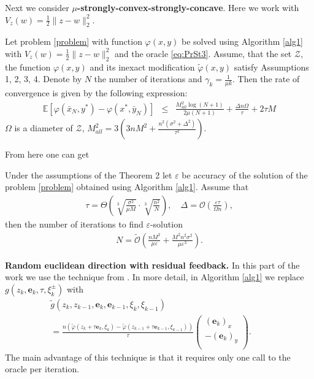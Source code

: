 \documentclass[runningheads]{llncs}
\newcommand{\EE}{\mathbf{E}}
\def\EE{\mathbb E}
\begin{document}
Next we consider \textbf{$\mu$-strongly-convex-strongly-concave}.  Here we work with $V_z(w) = \frac{1}{2}\|z-w\|^2_2$.

\begin{theorem} \label{th_main1}
Let problem \eqref{problem} with function $\varphi(x,y)$ be solved using Algorithm \ref{alg1} with $V_z(w) = \frac{1}{2}\|z-w\|^2_2$ and the oracle \eqref{eq:PrSt3}. Assume, that the set $\mathcal{Z}$, the function  $\varphi(x,y)$ and its inexact modification $\widetilde{\varphi}(x,y)$ satisfy Assumptions 1, 2, 3, 4. Denote by $N$ the number of iterations and $\gamma_k = \frac{1}{\mu k}$. Then the rate of convergence is given by the following expression:
\begin{eqnarray*}
\EE\left[\varphi(\bar x_N, y^*) - \varphi(x^*, \bar y_N)\right]
    &\leq& \frac{M^2_{all} \log  (N+1)}{2 \mu (N+1)} + \frac{\Delta n\Omega}{\tau} + 2\tau M
\end{eqnarray*}
$\Omega$ is a diameter of $\mathcal{Z}$, $M^2_{all} = 3\left(3n M^2 +\frac{n^2(\sigma^2 + \Delta^2)}{\tau^2}\right)$.
\end{theorem}
From here one can get 
\begin{corollary} Under the assumptions of the Theorem 2 let $\varepsilon$ be accuracy of the solution of the problem \eqref{problem} obtained using Algorithm \ref{alg1}. Assume that
\begin{eqnarray*}
    \tau = \Theta \left( \sqrt[3]{\frac{\sigma^2}{\mu M}} \cdot \sqrt[3]{\frac{n^2}{N}}\right),\quad \Delta = \mathcal{O} \left(\frac{\varepsilon \tau}{\Omega n}\right),
\end{eqnarray*}
then the number of iterations to find $\varepsilon$-solution
\begin{eqnarray*}
    N = \mathcal{\tilde O} \left( \frac{ n M^2 }{\mu\varepsilon}  + \frac{M^2 n^2 \sigma^2}{\mu \varepsilon^3}\right).
\end{eqnarray*}
\end{corollary}

\textbf{Random euclidean direction with residual feedback.} In this part of the work we use the technique from \cite{zhang2020improving}. In more detail, in Algorithm \ref{alg1} we replace $g(z_k, \mathbf{e}_k, \tau,  \xi^{\pm}_k)$ with 
\begin{eqnarray}
    \label{eq:PrSt5}
    \tilde g(z_k, z_{k-1},  \mathbf{e}_k, \mathbf{e}_{k-1},  \xi_k, \xi_{k-1}) \hspace{5cm}\nonumber\\
    = \frac{n \left(\tilde \varphi(z_k + \tau \mathbf{e}_k,  \xi_k) -  \tilde \varphi(z_{k-1} + \tau \mathbf{e}_{k-1},  \xi_{k-1})\right)}{\tau}\left(
    \begin{array}{c}
    (\mathbf{e}_k)_x\\
    -(\mathbf{e}_k)_y \\
    \end{array}
    \right). 
\end{eqnarray}
The main advantage of this technique is that it requires only one call to the oracle per iteration. 
\end{document}
